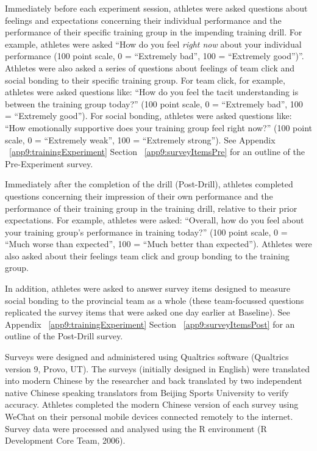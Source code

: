 Immediately before each experiment session, athletes were asked questions about feelings and expectations concerning their individual performance and the performance of their specific training group in the impending training drill.  For example,  athletes were asked ``How do you feel \textit{right now} about your individual performance (100 point scale, 0 = ``Extremely bad'', 100 = ``Extremely good'')''.  Athletes were also asked a series of questions about feelings of team click and social bonding to their specific training group. For team click, for example, athletes were asked questions like: ``How do you feel the tacit understanding is between the training group today?'' (100 point scale, 0 = ``Extremely bad'', 100 = ``Extremely good'').  For social bonding, athletes were asked questions like: ``How emotionally supportive does your training group feel right now?'' (100 point scale, 0 = ``Extremely weak'', 100 = ``Extremely strong'').  See Appendix ~\ref{app9:trainingExperiment} Section ~\ref{app9:surveyItemsPre} for an outline of the Pre-Experiment survey.

Immediately after the completion of the drill (Post-Drill), athletes completed questions concerning their impression of their own performance and the performance of their training group in the training drill, relative to their prior expectations.  For example,  athletes were asked: ``Overall, how do you feel about your training group's performance in training today?'' (100 point scale, 0 = ``Much worse than expected'', 100 = ``Much better than expected'').  Athletes were also asked about their feelings team click and group bonding to the training group.

In addition, athletes were asked to answer survey items designed to measure social bonding to the provincial team as a whole (these team-focussed questions replicated the survey items that were asked one day earlier at Baseline).  See Appendix ~\ref{app9:trainingExperiment} Section ~\ref{app9:surveyItemsPost} for an outline of the Post-Drill survey.

Surveys were designed and administered using Qualtrics software (Qualtrics version 9, Provo, UT). The surveys (initially designed in English) were translated into modern Chinese by the researcher and back translated by two independent native Chinese speaking translators from Beijing Sports University to verify accuracy.  Athletes completed the modern Chinese version of each survey using WeChat on their personal mobile devices connected remotely to the internet. Survey data were processed and analysed using the R environment (R Development Core Team, 2006).

